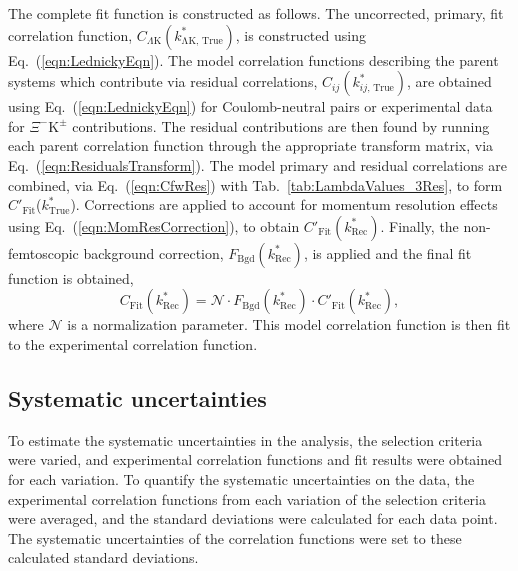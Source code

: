\documentclass[ALICE,manyauthors]{cernphprep}
\newcommand{\ktrue}{$k^{*}_{\mathrm{True}}$\xspace}
\newcommand{\XiKpm}{$\Xi^{-}\mathrm{K^{\pm}}$\xspace}
\begin{document}
The complete fit function is constructed as follows.
The uncorrected, primary, fit correlation function, $C_{\Lambda\mathrm{K}}(k^{*}_{\mathrm{\Lambda K,\,True}})$, is constructed using Eq.~(\ref{eqn:LednickyEqn}).
The model correlation functions describing the parent systems which contribute via residual correlations, $C_{ij}(k^{*}_{ij,\,\mathrm{True}})$, are obtained using Eq.~(\ref{eqn:LednickyEqn}) for Coulomb-neutral pairs or experimental data for \XiKpm contributions.
The residual contributions are then found by running each parent correlation function through the appropriate transform matrix, via Eq.~(\ref{eqn:ResidualsTransform}).
The model primary and residual correlations are combined, via Eq.~(\ref{eqn:CfwRes}) with Tab.~\ref{tab:LambdaValues_3Res}, to form $C'_{\mathrm{Fit}}$(\ktrue).
Corrections are applied to account for momentum resolution effects using Eq.~(\ref{eqn:MomResCorrection}), to obtain $C'_{\mathrm{Fit}}(k^{*}_{\mathrm{Rec}})$.
Finally, the non-femtoscopic background correction, $F_{\mathrm{Bgd}}(k^{*}_{\mathrm{Rec}})$, is applied and the final fit function is obtained,
\begin{equation}
C_{\mathrm{Fit}}(k^{*}_{\mathrm{Rec}}) = \mathcal{N}\cdot F_{\mathrm{Bgd}}(k^{*}_{\mathrm{Rec}})\cdot C'_{\mathrm{Fit}}(k^{*}_{\mathrm{Rec}}),
\end{equation}
where $\mathcal{N}$ is a normalization parameter.
This model correlation function is then fit to the experimental correlation function.

\subsection{Systematic uncertainties}
\label{SysErrs}

To estimate the systematic uncertainties in the analysis, the selection criteria were varied, and experimental correlation functions and fit results were obtained for each variation.
To quantify the systematic uncertainties on the data, the experimental correlation functions from each variation of the selection criteria were averaged, and the standard deviations were calculated for each data point.
The systematic uncertainties of the correlation functions were set to these calculated standard deviations.
\end{document}
